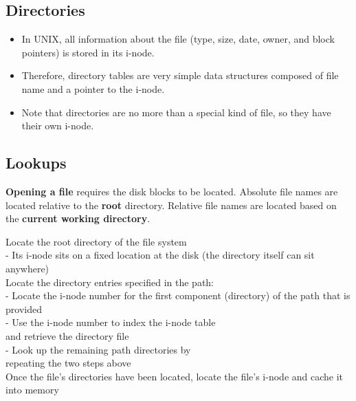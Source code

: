 \documentclass{article}
\begin{document}
\subsection{Directories}
\begin{itemize}
	\item In UNIX, all information about the file (type, size, date, owner, and block pointers) is stored in its i-node. 
	\item Therefore, directory tables are very simple data structures composed of file name and a pointer to the i-node. 
	\item Note that directories are no more than a special kind of file, so they have their own i-node.
\end{itemize}

\subsection{Lookups}
\begin{flushleft}
\textbf{Opening a file} requires the disk blocks to be located. Absolute file names are located relative to the \textbf{root} directory. Relative file names are located based on the \textbf{current working directory}.\\
\enskip

Locate the root directory of the file system\\
- Its i-node sits on a fixed location at the disk
(the directory itself can sit anywhere)\\
Locate the directory entries specified in the path:\\
- Locate the i-node number for the first component
(directory) of the path that is provided\\
- Use the i-node number to index the i-node table\\
and retrieve the directory file\\
- Look up the remaining path directories by\\
repeating the two steps above\\
Once the file’s directories have been located, locate
the file’s i-node and cache it into memory
\end{flushleft}
\end{document}
